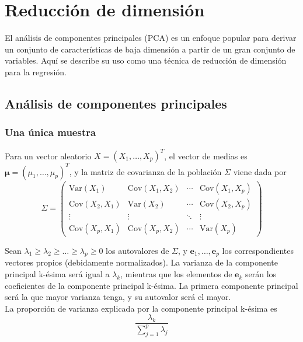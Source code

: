 \section{Reducción de dimensión}

El análisis de componentes principales (PCA) es un enfoque popular para derivar un conjunto de características de baja dimensión a partir de un gran conjunto de variables. Aquí se describe su uso como una técnica de reducción de dimensión para la regresión.

\subsection{Análisis de componentes principales}

\subsubsection{Una única muestra}

Para un vector aleatorio $X = (X_1, \dots, X_p)^T$, el vector de medias es $\boldsymbol{\mu} = (\mu_1, \dots, \mu_p)^T$, y la matriz de covarianza de la población $\Sigma$ viene dada por 
\begin{equation}
\Sigma = \begin{pmatrix}
\text{Var}(X_1) & \text{Cov}(X_1, X_2) & \cdots & \text{Cov}(X_1, X_p) \\
\text{Cov}(X_2, X_1) & \text{Var}(X_2) & \cdots & \text{Cov}(X_2, X_p) \\
\vdots & \vdots & \ddots & \vdots \\
\text{Cov}(X_p, X_1) & \text{Cov}(X_p, X_2) & \cdots & \text{Var}(X_p)
\end{pmatrix}
\end{equation}

Sean $\lambda_1 \geq \lambda_2  \geq \dots \geq \lambda_p \geq 0$ los autovalores de $\Sigma$, y $\mathbf{e}_1, \dots, \mathbf{e}_p$ los correspondientes vectores propios (debidamente normalizados). La varianza de la componente principal k-ésima será igual a $\lambda_k$, mientras que los elementos de $\mathbf{e}_k$ serán los coeficientes de la componente principal k-ésima. La primera componente principal será la que mayor varianza tenga, y su autovalor será el mayor. \\

\noindent La proporción de varianza explicada por la componente principal k-ésima es 
\begin{equation}
\frac{\lambda_k}{\sum_{j=1}^p \lambda_j}
\end{equation}

